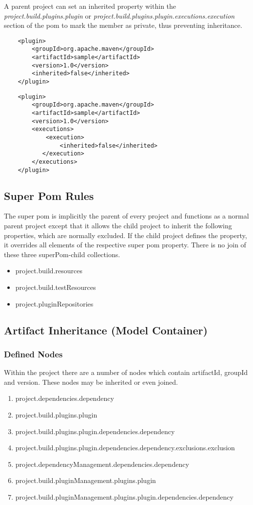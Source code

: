 \documentclass[12pt]{amsart}
\begin{document}
A parent project can set an inherited property within the \emph{project.build.plugins.plugin} or \emph{project.build.plugins.plugin.executions.execution} section of the pom to mark the member as private, thus preventing inheritance.

\begin{verbatim}
    <plugin>
        <groupId>org.apache.maven</groupId>
        <artifactId>sample</artifactId>
        <version>1.0</version>
        <inherited>false</inherited>
    </plugin>
\end{verbatim}

\begin{verbatim}
    <plugin>
        <groupId>org.apache.maven</groupId>
        <artifactId>sample</artifactId>
        <version>1.0</version>
        <executions>
            <execution>
                <inherited>false</inherited>
           </execution>
        </executions>
    </plugin>
\end{verbatim}

\subsection{Super Pom Rules}
The super pom is implicitly  the parent of every project and functions as a normal parent project except that it allows the child project to inherit the following properties, which are normally excluded. If the child project defines the property,  it overrides all elements of the respective super pom property. There is no join of these three superPom-child collections.
\begin{itemize}
\item project.build.resources
\item project.build.testResources
\item project.pluginRepositories 
\end{itemize}

\subsection{Artifact Inheritance (Model Container)}
\subsubsection{Defined Nodes}
Within the project there are a number of nodes which contain artifactId, groupId and version. These nodes may be inherited or even joined.
\begin{enumerate}
\item project.dependencies.dependency
\item project.build.plugins.plugin
\item project.build.plugins.plugin.dependencies.dependency
\item project.build.plugins.plugin.dependencies.dependency.exclusions.exclusion
\item project.dependencyManagement.dependencies.dependency
\item project.build.pluginManagement.plugins.plugin
\item project.build.pluginManagement.plugins.plugin.dependencies.dependency
\end{enumerate}
\end{document}
